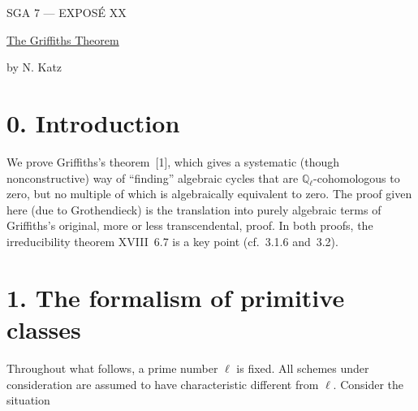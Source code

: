 \clearpage
\begin{center}
{\large SGA 7 --- EXPOS\'E XX}\par
\vspace{2em}
{\Large\underline{The Griffiths Theorem}}\par
\vspace{1.5em}
{\large by N. Katz}
\end{center}

\section*{0. Introduction}

We prove Griffiths's theorem~[1], which gives a systematic (though
nonconstructive) way of ``finding'' algebraic cycles that are
$\mathbb Q_\ell$-cohomologous to zero, but no multiple of which is
algebraically equivalent to zero.  The proof given here (due to
Grothendieck) is the translation into purely algebraic terms of Griffiths's
original, more or less transcendental, proof.  In both proofs, the
irreducibility theorem XVIII~6.7 is a key point (cf.~3.1.6 and~3.2).

\section*{1. The formalism of primitive classes}

Throughout what follows, a prime number $\ell$ is fixed.  All schemes under
consideration are assumed to have characteristic different from $\ell$.
Consider the situation

